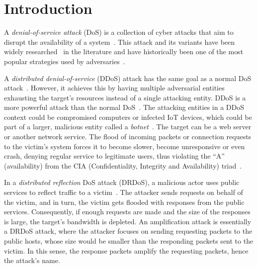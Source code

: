 \section{Introduction}


 A \textit{denial-of-service attack} (DoS) is a collection of cyber attacks that aim to disrupt the availability of a system~\cite{cloud_dos}. This attack and its variants have been widely researched~\cite{ddos_taxonomy} in the literature and have historically been one of the most popular strategies used by adversaries~\cite{crowdstrike_popular_attacks}. 

 A \textit{distributed denial-of-service} (DDoS) attack has the same goal as a normal DoS attack~\cite{cloud_ddos}. However, it achieves this by having multiple adversarial entities exhausting the target's resources instead of a single attacking entity. DDoS is a more powerful attack than the normal DoS~\cite{cloud_ddos}. The attacking entities in a DDoS context could be compromised computers or infected IoT devices, which could be part of a larger, malicious entity called a \textit{botnet}~\cite{crowdstrike_botnet}. The target can be a web server or another network service. The flood of incoming packets or connection requests to the victim's system forces it to become slower, become unresponsive or even crash, denying regular service to legitimate users, thus violating the ``A'' (availability) from the CIA (Confidentiality, Integrity and Availability) triad~\cite{cia-triad}.

 In a \textit{distributed reflection} DoS attack (DRDoS), a malicious actor uses public services to reflect traffic to a victim~\cite{amplification_hell}. The attacker sends requests on behalf of the victim, and in turn, the victim gets flooded with responses from the public services. Consequently, if enough requests are made and the size of the responses is large, the target's bandwidth is depleted. An amplification attack is essentially a DRDoS attack, where the attacker focuses on sending requesting packets to the public hosts, whose size would be smaller than the responding packets sent to the victim. In this sense, the response packets amplify the requesting packets, hence the attack's name. 


